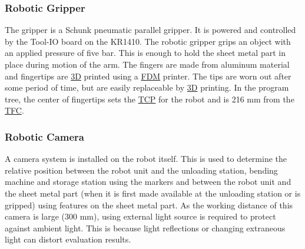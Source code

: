 \subsubsection{Robotic Gripper}
The gripper is a Schunk pneumatic parallel gripper. It is powered and controlled by the Tool-IO board on the KR1410.
The robotic gripper grips an object with an applied pressure of five bar. This is enough to hold the sheet metal part
in place during motion of the arm. 
The fingers are made from aluminum material and fingertips are \hyperref[acro:3D]{3D} printed using a \hyperref[acro:FDM]{FDM} printer.  The tips are worn out
after some period of time, but are easily replaceable by \hyperref[acro:3D]{3D} printing.
In the program tree, the center of fingertips sets the \hyperref[acro:TCP]{TCP} for the robot and is 216 mm from the \hyperref[acro:TFC]{TFC}.


\subsubsection{Robotic Camera}
A camera system is installed on the robot itself. This is used to determine the relative
position between the robot unit and the unloading station, bending machine and storage station using the markers
and between the robot unit and the sheet metal part (when it is first made available at the
unloading station or is gripped) using features on the sheet metal part.
As the working distance of this camera is large (300 mm), using external light source is required to protect against ambient light. 
This is because light reflections or changing extraneous light can distort evaluation results.
